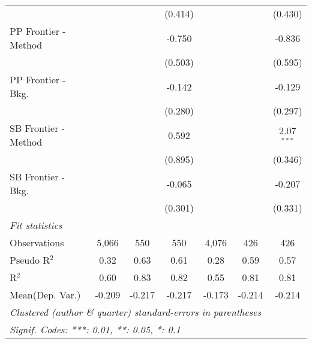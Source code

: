 \begin{tabular}{lcccccc}
                        &         &              & (0.414)       &         &            & (0.430)\\   
   PP Frontier - Method &         &              & -0.750        &         &            & -0.836\\   
                        &         &              & (0.503)       &         &            & (0.595)\\   
   PP Frontier - Bkg.   &         &              & -0.142        &         &            & -0.129\\   
                        &         &              & (0.280)       &         &            & (0.297)\\   
   SB Frontier - Method &         &              & 0.592         &         &            & 2.07$^{***}$\\   
                        &         &              & (0.895)       &         &            & (0.346)\\   
   SB Frontier - Bkg.   &         &              & -0.065        &         &            & -0.207\\   
                        &         &              & (0.301)       &         &            & (0.331)\\   
   \midrule
   \emph{Fit statistics}\\
   Observations         & 5,066   & 550          & 550           & 4,076   & 426        & 426\\  
   Pseudo R$^2$         & 0.32    & 0.63         & 0.61          & 0.28    & 0.59       & 0.57\\  
   R$^2$                & 0.60    & 0.83         & 0.82          & 0.55    & 0.81       & 0.81\\  
Mean(Dep. Var.) & -0.209 & -0.217 & -0.217 & -0.173 & -0.214 & -0.214 \\
   \midrule \midrule
   \multicolumn{7}{l}{\emph{Clustered (author \& quarter) standard-errors in parentheses}}\\
   \multicolumn{7}{l}{\emph{Signif. Codes: ***: 0.01, **: 0.05, *: 0.1}}\\
\end{tabular}
\par\endgroup
